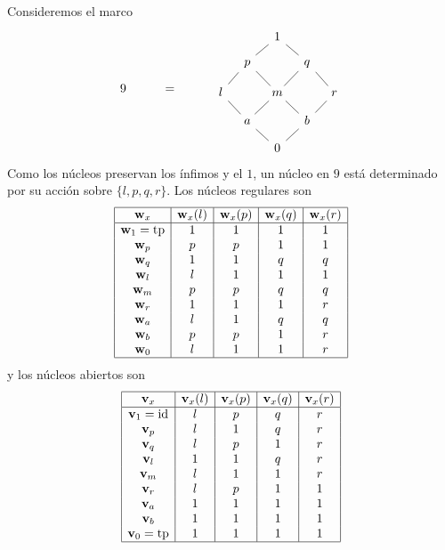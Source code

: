 \begin{example}%
  Consideremos el marco
  \[
      9 \hspace{10mm} = \hspace{10mm} 
      \begin{tikzcd}[row sep=3mm, column sep=3mm]
          & & 1 \\
          & p \ar[ur,no head] && q \ar[ul,no head] \\
          l \ar[ur,no head]
              && m \ar[ul,no head] \ar[ur,no head]
              && r \ar[ul,no head] \\
          & a \ar[ul,no head]\ar[ur,no head]
              && b\ar[ul,no head]\ar[ur,no head] \\
          & & 0 \ar[ul,no head]\ar[ur,no head]
      \end{tikzcd}
  \]
  Como los núcleos preservan los ínfimos y el $1$, un núcleo en $9$
  está determinado por su acción sobre $\{l,p,q,r\}$.
  Los núcleos regulares son
  \[ 
      \begin{array}{|c|c|c|c|c|}
          \hline
      \mathbf w_{x} & \mathbf w_{x}(l) & \mathbf w_{x}(p) & \mathbf w_{x}(q) & \mathbf w_{x}(r) \\
          \hline
    \mathbf w_{1} = \mathrm{tp} &  1   & 1    & 1    & 1 \\
          \mathbf w_{p} &  p   & p    & 1    & 1 \\
          \mathbf w_{q} &  1   & 1    & q    & q \\
          \mathbf w_{l} &  l   & 1    & 1    & 1 \\
          \mathbf w_{m} &  p   & p    & q    & q \\
          \mathbf w_{r} &  1   & 1    & 1    & r \\
          \mathbf w_{a} &  l   & 1    & q    & q \\
          \mathbf w_{b} &  p   & p    & 1    & r \\
          \mathbf w_{0} &  l   & 1    & 1    & r \\
          \hline
      \end{array}
  \]
  y los núcleos abiertos son
  \[ 
      \begin{array}{|c|c|c|c|c|}
          \hline
       \mathbf v_{x} & \mathbf v_{x}(l) & \mathbf v_{x}(p) & \mathbf v_{x}(q) & \mathbf v_{x}(r) \\
          \hline
    \mathbf v_{1} = \mathrm{id} &  l   & p    & q    & r \\
          \mathbf v_{p} &  l   & 1    & q    & r \\
          \mathbf v_{q} &  l   & p    & 1    & r \\
          \mathbf v_{l} &  1   & 1    & q    & r \\
          \mathbf v_{m} &  l   & 1    & 1    & r \\
          \mathbf v_{r} &  l   & p    & 1    & 1 \\
          \mathbf v_{a} &  1   & 1    & 1    & 1 \\
          \mathbf v_{b} &  1   & 1    & 1    & 1 \\
    \mathbf v_{0} = \mathrm{tp} &  1   & 1    & 1    & 1 \\
          \hline
      \end{array}
  \]
\end{example}


